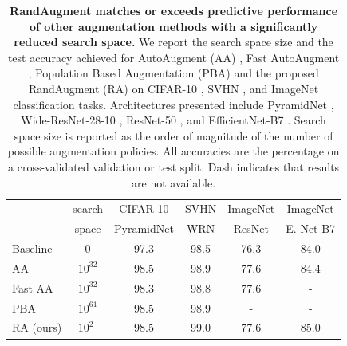 \bgroup
\def\arraystretch{1.3}%
\begin{table}[t]
\scriptsize
\centering
\begin{tabular}{l|c|c|c|c|c}
&search &CIFAR-10 & SVHN & ImageNet& ImageNet\\
&space&PyramidNet & WRN & ResNet & E. Net-B7\\
\hline

Baseline & 0 & 97.3  & 98.5  & 76.3  & 84.0 \\
\hline
AA        & $10^{32}$              & 98.5                & 98.9                     & 77.6                          & 84.4            \\
Fast AA   & $10^{32}$               & 98.3                         & 98.8                    & 77.6                           & -                  \\
PBA       & $10^{61}$               & 98.5            & 98.9                  & -                   & -                  \\
RA (ours) & $10^{2\,\,\,}$                & 98.5                           & 99.0      & 77.6                             & 85.0             \\
\end{tabular}
\vspace{0.2cm}
\caption{\textbf{RandAugment matches or exceeds predictive performance of other augmentation methods with a significantly reduced search space.} We report the search space size and the test accuracy achieved for AutoAugment (AA) \cite{cubuk2018autoaugment}, Fast AutoAugment \cite{lim2019fast}, Population Based Augmentation (PBA) \cite{ho2019population} and the proposed RandAugment (RA) on CIFAR-10 \cite{krizhevsky2009learning}, SVHN \cite{netzer2011reading}, and ImageNet \cite{imagenet2009} classification tasks.
Architectures presented include PyramidNet \cite{han2017deep}, Wide-ResNet-28-10 \cite{WRN2016}, ResNet-50 \cite{he2016deep},  and EfficientNet-B7 \cite{tan2019efficientnet}.
Search space size is reported as the order of magnitude of the number of possible augmentation policies. All accuracies are the percentage on a cross-validated validation or test split. Dash indicates that results are not available.}
\label{tab:summary_results}  
\end{table}
\egroup